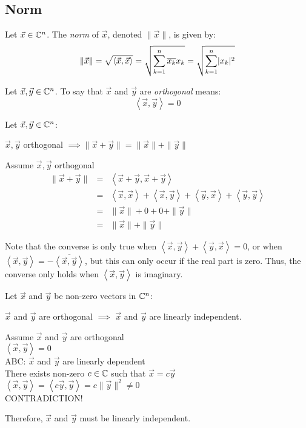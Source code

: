 \documentclass[letterpaper,12pt,fleqn]{article}
\newcommand{\inner}[2]{\left<#1,#2\right>}
\newcommand{\conj}[1]{\overline{#1}}
\newcommand{\norm}[1]{\|#1\|}
\newcommand{\vx}{\vec{x}}
\newcommand{\vy}{\vec{y}}
\begin{document}
\newpage

\subsection*{Norm}

\begin{definition}[Norm]
  Let $\vx\in\C^n$. The \emph{norm} of $\vx$, denoted $\norm{\vx}$, is given by:
  \[\norm{\vx}=\sqrt{\inner{\vx}{\vx}}=\sqrt{\sum_{k=1}^n\conj{x_k}x_k}=
  \sqrt{\sum_{k=1}^n\abs{x_k}^2}\]
\end{definition}

\begin{definition}[Orthogonal]
  Let $\vx,\vy\in\C^n$. To say that $\vx$ and $\vy$ are \emph{orthogonal}
  means:
  \[\inner{\vx}{\vy}=0\]
\end{definition}

\begin{theorem}
  Let $\vx,\vy\in\C^n$:

  $\vx,\vy$ orthogonal $\implies\norm{\vx+\vy}=\norm{\vx}+\norm{\vy}$
\end{theorem}

\begin{theproof}
  Assume $\vx,\vy$ orthogonal
  \begin{eqnarray*}
    \norm{\vx+\vy} &=& \inner{\vx+\vy}{\vx+\vy} \\
    &=& \inner{\vx}{\vx}+\inner{\vx}{\vy}+\inner{\vy}{\vx}+\inner{\vy}{\vy} \\
    &=& \norm{\vx}+0+0+\norm{\vy} \\
    &=& \norm{\vx}+\norm{\vy}
  \end{eqnarray*}
\end{theproof}

Note that the converse is only true when $\inner{\vx}{\vy}+\inner{\vy}{\vx}=0$,
or when $\inner{\vx}{\vy}=-\conj{\inner{\vx}{\vy}}$, but this can only occur
if the real part is zero. Thus, the converse only holds when $\inner{\vx}{\vy}$
is imaginary.

\begin{theorem}
  Let $\vx$ and $\vy$ be non-zero vectors in $\mathbb{C}^n$:

  $\vx$ and $\vy$ are orthogonal $\implies$ $\vx$ and $\vy$ are linearly
  independent.
\end{theorem}

\begin{theproof}
  Assume $\vx$ and $\vy$ are orthogonal \\
  $\inner{\vx}{\vy}=0$ \\
  ABC: $\vx$ and $\vy$ are linearly dependent \\
  There exists non-zero $c\in\mathbb{C}$ such that $\vx=c\vy$ \\
  $\inner{\vx}{\vy}=\inner{c\vy}{\vy}=c\norm{\vy}^2\ne0$ \\
  CONTRADICTION!
  
  Therefore, $\vx$ and $\vy$ must be linearly independent.
\end{theproof}
\end{document}
